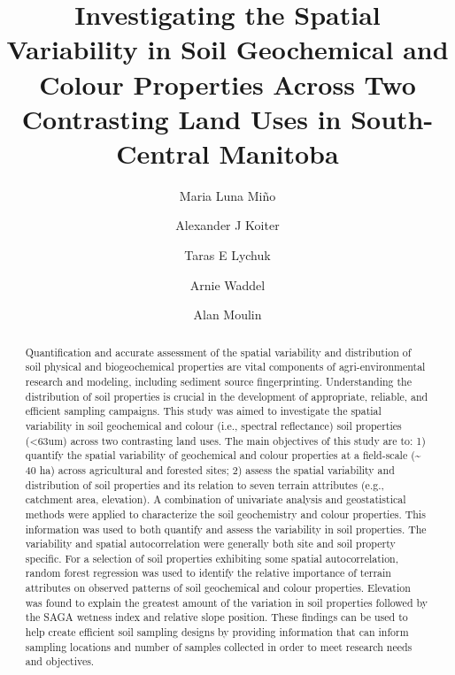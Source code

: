 \documentclass[
  number]{elsarticle}
\begin{document}
\begin{frontmatter}
\title{Investigating the Spatial Variability in Soil Geochemical and
Colour Properties Across Two Contrasting Land Uses in South-Central
Manitoba}
\author[1]{Maria Luna Miño%
%
}
\author[2]{Alexander J Koiter%
%
}
\author[3]{Taras E Lychuk%
%
}
\author[3]{Arnie Waddel%
%
}
\author[3]{Alan Moulin%
%
}







        
\begin{abstract}
Quantification and accurate assessment of the spatial variability and
distribution of soil physical and biogeochemical properties are vital
components of agri-environmental research and modeling, including
sediment source fingerprinting. Understanding the distribution of soil
properties is crucial in the development of appropriate, reliable, and
efficient sampling campaigns. This study was aimed to investigate the
spatial variability in soil geochemical and colour (i.e., spectral
reflectance) soil properties (\textless63um) across two contrasting land
uses. The main objectives of this study are to: 1) quantify the spatial
variability of geochemical and colour properties at a field-scale
(\textasciitilde{} 40 ha) across agricultural and forested sites; 2)
assess the spatial variability and distribution of soil properties and
its relation to seven terrain attributes (e.g., catchment area,
elevation). A combination of univariate analysis and geostatistical
methods were applied to characterize the soil geochemistry and colour
properties. This information was used to both quantify and assess the
variability in soil properties. The variability and spatial
autocorrelation were generally both site and soil property specific. For
a selection of soil properties exhibiting some spatial autocorrelation,
random forest regression was used to identify the relative importance of
terrain attributes on observed patterns of soil geochemical and colour
properties. Elevation was found to explain the greatest amount of the
variation in soil properties followed by the SAGA wetness index and
relative slope position. These findings can be used to help create
efficient soil sampling designs by providing information that can inform
sampling locations and number of samples collected in order to meet
research needs and objectives.
\end{abstract}






\end{frontmatter}
\end{document}
